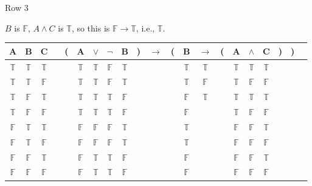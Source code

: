 \documentclass[
  ignorenonframetext,
]{beamer}
\renewcommand{\,}{\text{, }}
\def\True{\mathbb{T}}
\def\False{\mathbb{F}}
\begin{document}
\begin{frame}{Row 3}
\protect\hypertarget{row-3}{}

\(B\) is \(\False\), \(A \wedge C\) is \(\True\), so this is
\(\False \rightarrow \True\), i.e., \(\True\).

\begin{center}
\bigskip
\begin{tabular}{@{ }c@{ }@{ }c@{ }@{ }c | c@{ }@{}c@{}@{ }c@{ }@{ }c@{ }@{ }c@{ }@{ }c@{ }@{}c@{}@{ }c@{ }@{}c@{}@{ }c@{ }@{ }c@{ }@{}c@{}@{ }c@{ }@{ }c@{ }@{ }c@{ }@{}c@{}@{}c@{}@{ }c}
A & B & C &  & ( & A & $\vee$ & $\neg$ & B & ) & $\rightarrow$ & ( & B & $\rightarrow$ & ( & A & $\wedge$ & C & ) & ) & \\
\hline 
 $\True$ & $\True$ & $\True$ &  &  & $\True$ & $\True$ & $\False$ & $\True$ &  &&  & $\True$ & $\True$ &  & $\True$ & $\True$ & $\True$ &  &  & \\
 $\True$ & $\True$ & $\False$ &  &  & $\True$ & $\True$ & $\False$ & $\True$ &  &&  & $\True$ & $\False$ &  & $\True$ & $\False$ & $\False$ &  &  & \\
 $\True$ & $\False$ & $\True$ &  &  & $\True$ & $\True$ & $\True$ & $\False$ &  &&  & $\False$ & $\True$ &  & $\True$ & $\True$ & $\True$ &  &  & \\
 $\True$ & $\False$ & $\False$ &  &  & $\True$ & $\True$ & $\True$ & $\False$ &  &&  & $\False$ &&  & $\True$ & $\False$ & $\False$ &  &  & \\
 $\False$ & $\True$ & $\True$ &  &  & $\False$ & $\False$ & $\False$ & $\True$ &  &&  & $\True$ &&  & $\False$ & $\False$ & $\True$ &  &  & \\
 $\False$ & $\True$ & $\False$ &  &  & $\False$ & $\False$ & $\False$ & $\True$ &  &&  & $\True$ &&  & $\False$ & $\False$ & $\False$ &  &  & \\
 $\False$ & $\False$ & $\True$ &  &  & $\False$ & $\True$ & $\True$ & $\False$ &  &&  & $\False$ &&  & $\False$ & $\False$ & $\True$ &  &  & \\
 $\False$ & $\False$ & $\False$ &  &  & $\False$ & $\True$ & $\True$ & $\False$ &  &&  & $\False$ &&  & $\False$ & $\False$ & $\False$ &  &  & \\
\end{tabular}
\bigskip
\end{center}

\end{frame}
\end{document}

